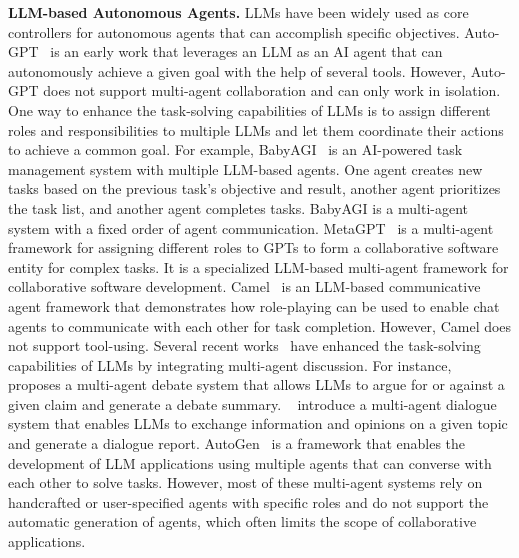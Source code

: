 \noindent
\textbf{LLM-based Autonomous Agents.}
LLMs have been widely used as core controllers for autonomous agents that can accomplish specific objectives. Auto-GPT~\cite{gravitasauto} is an early work that leverages an LLM as an AI agent that can autonomously achieve a given goal with the help of several tools. However, Auto-GPT does not support multi-agent collaboration and can only work in isolation.
One way to enhance the task-solving capabilities of LLMs is to assign different roles and responsibilities to multiple LLMs and let them coordinate their actions to achieve a common goal. For example, BabyAGI~\cite{nakajima2023task} is an AI-powered task management system with multiple LLM-based agents. One agent creates new tasks based on the previous task’s objective and result, another agent prioritizes the task list, and another agent completes tasks. BabyAGI is a multi-agent system with a fixed order of agent communication. MetaGPT~\cite{hong2023metagpt} is a multi-agent framework for assigning different roles to GPTs to form a collaborative software entity for complex tasks. It is a specialized LLM-based multi-agent framework for collaborative software development. Camel~\cite{li2023camel} is an LLM-based communicative agent framework that demonstrates how role-playing can be used to enable chat agents to communicate with each other for task completion. However, Camel does not support tool-using.
Several recent works~\cite{wang2023unleashing,du2023improving,liang2023encouraging,hao2023chatllm,talebirad2023multi,josifoski2023flows} have enhanced the task-solving capabilities of LLMs by integrating multi-agent discussion. For instance, ~\cite{wang2023unleashing} proposes a multi-agent debate system that allows LLMs to argue for or against a given claim and generate a debate summary. 
~\cite{du2023improving} introduce a multi-agent dialogue system that enables LLMs to exchange information and opinions on a given topic and generate a dialogue report. AutoGen~\cite{wu2023autogen} is a framework that enables the development of LLM applications using multiple agents that can converse with each other to solve tasks.
However, most of these multi-agent systems rely on handcrafted or user-specified agents with specific roles and do not support the automatic generation of agents, which often limits the scope of collaborative applications.

